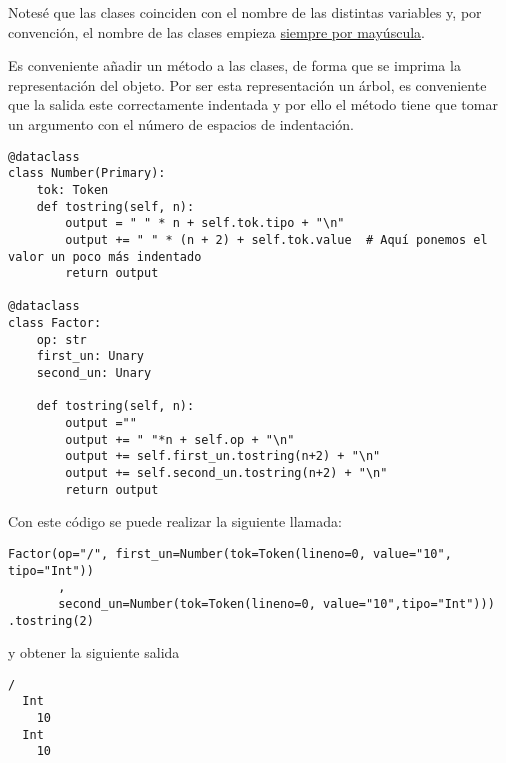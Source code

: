 Notesé que las clases coinciden con el nombre de las distintas variables y, por convención, el nombre de las clases empieza \href{https://peps.python.org/pep-0008/}{siempre por mayúscula}.
\label{sec:orgaecb9f9}

Es conveniente añadir un método a las clases, de forma que se imprima la representación del objeto. Por ser esta representación un árbol, es conveniente que la salida este correctamente indentada y por ello el método tiene que tomar un argumento con el número de espacios de indentación.

\begin{verbatim}
@dataclass
class Number(Primary):
    tok: Token
    def tostring(self, n):
        output = " " * n + self.tok.tipo + "\n"
        output += " " * (n + 2) + self.tok.value  # Aquí ponemos el valor un poco más indentado
        return output

@dataclass
class Factor:
    op: str
    first_un: Unary
    second_un: Unary

    def tostring(self, n):
        output =""
        output += " "*n + self.op + "\n"
        output += self.first_un.tostring(n+2) + "\n"
        output += self.second_un.tostring(n+2) + "\n"
        return output

\end{verbatim}

Con este código se puede realizar la siguiente llamada:
\begin{verbatim}
Factor(op="/", first_un=Number(tok=Token(lineno=0, value="10", tipo="Int"))
       ,
       second_un=Number(tok=Token(lineno=0, value="10",tipo="Int")))
.tostring(2)
\end{verbatim}

y obtener la siguiente salida

\begin{verbatim}
/
  Int
    10
  Int
    10
\end{verbatim}
\label{sec:orgef07ad2}


